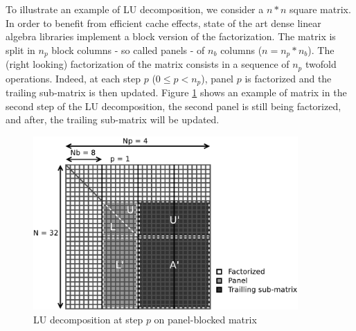 To illustrate an example of LU decomposition, we consider a $n*n$ square matrix. In order to benefit from efficient cache effects, state of the art dense linear algebra libraries implement a block version of the factorization. The matrix is split in $n_p$ block columns - so called panels - of $n_b$ columns ($n = n_p * n_b$). The (right looking) factorization of the matrix consists in a sequence of $n_p$ twofold operations. Indeed, at each step $p$ ($0 \leq p < n_p$), panel $p$ is factorized and the trailing sub-matrix is then updated. Figure \ref{fig:matrix} shows an example of matrix in the second step of the LU decomposition, the second panel is still being factorized, and after, the trailing sub-matrix will be updated.

\begin{figure}[!ht]
\centering
\includegraphics[width=0.9\textwidth]{figures/panel_matrix_bw.pdf}
\caption{LU decomposition at step $p$ on panel-blocked matrix \label{fig:matrix}}
\end{figure}

